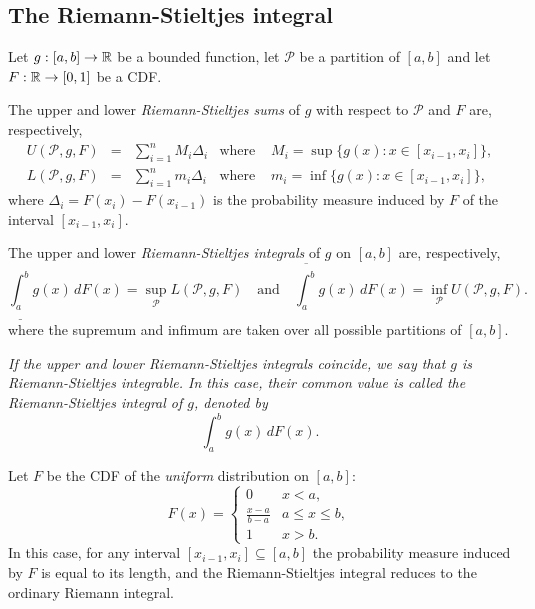 \subsection{The Riemann-Stieltjes integral}
Let $g:[a,b]\to\mathbb{R}$ be a bounded function, let $\mathcal{P}$ be a partition of $[a,b]$ and let $F:\mathbb{R}\to[0,1]$ be a CDF.

\bigskip
The upper and lower \emph{Riemann-Stieltjes sums} of $g$ with respect to $\mathcal{P}$ and $F$ are, respectively,
\[
\begin{array}{lclcl}
U(\mathcal{P},g,F)	& = & \displaystyle\sum_{i=1}^n M_i\Delta_i 	& \text{where } & M_i = \sup\{g(x): x\in [x_{i-1}, x_i]\}, \\
L(\mathcal{P},g,F) 	& = & \displaystyle\sum_{i=1}^n m_i\Delta_i	& \text{where } & m_i = \inf\{g(x): x\in [x_{i-1}, x_i]\},
\end{array}
\]
where $\Delta_i = F(x_i)- F(x_{i-1})$ is the probability measure induced by $F$ of the interval $[x_{i-1},x_i]$.

\bigskip
The upper and lower \emph{Riemann-Stieltjes integrals} of $g$ on $[a,b]$ are, respectively,
\[
\underline{\int_a^b} g(x)\,dF(x) = \sup_{\mathcal{P}} L(\mathcal{P},g,F)
\quad\text{and}\quad
\overline{\int_a^b} g(x)\,dF(x)  = \inf_{\mathcal{P}} U(\mathcal{P},g,F).
\]
where the supremum and infimum are taken over all possible partitions of $[a,b]$.

\bit
\it If the upper and lower Riemann-Stieltjes integrals coincide, we say that $g$ is \emph{Riemann-Stieltjes integrable}.
\it In this case, their common value is called the \emph{Riemann-Stieltjes integral} of $g$, denoted by
\[
\displaystyle\int_a^b g(x)\,dF(x).
\]
\eit


\begin{remark}
Let $F$ be the CDF of the \emph{uniform} distribution on $[a,b]$:
\[
F(x) = \begin{cases}
	0 								& x < a, \\
	\displaystyle\frac{x-a}{b-a}	& a\leq x\leq b, \\
	1								& x > b.
\end{cases}
\]
In this case, for any interval $[x_{i-1}, x_i] \subseteq [a,b]$ the probability measure induced by $F$ is equal to its length, and the Riemann-Stieltjes integral reduces to the ordinary Riemann integral.
\end{remark}


\endinput
